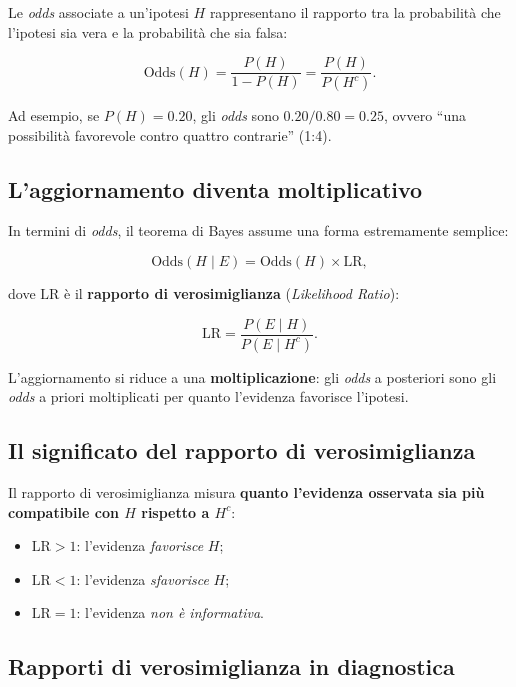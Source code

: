 \documentclass[
  italian,
  letterpaper,
  a4paper,
  11pt,
  open=any]{scrbook}
\providecommand{\tightlist}{%
  \setlength{\itemsep}{0pt}\setlength{\parskip}{0pt}}
\theoremstyle{plain}
\theoremstyle{definition}
\theoremstyle{definition}
\theoremstyle{remark}
\begin{document}
Le \emph{odds} associate a un'ipotesi \(H\) rappresentano il rapporto
tra la probabilità che l'ipotesi sia vera e la probabilità che sia
falsa:

\[
\text{Odds}(H) = \frac{P(H)}{1 - P(H)} = \frac{P(H)}{P(H^c)}.
\]

Ad esempio, se \(P(H) = 0.20\), gli \emph{odds} sono
\(0.20/0.80 = 0.25\), ovvero ``una possibilità favorevole contro quattro
contrarie'' (1:4).

\subsection{L'aggiornamento diventa
moltiplicativo}\label{laggiornamento-diventa-moltiplicativo}

In termini di \emph{odds}, il teorema di Bayes assume una forma
estremamente semplice:

\[
\text{Odds}(H \mid E) = \text{Odds}(H) \times \text{LR},
\]

dove \(\text{LR}\) è il \textbf{rapporto di verosimiglianza}
(\emph{Likelihood Ratio}):

\[
\text{LR} = \frac{P(E \mid H)}{P(E \mid H^c)}.
\]

L'aggiornamento si riduce a una \textbf{moltiplicazione}: gli
\emph{odds} a posteriori sono gli \emph{odds} a priori moltiplicati per
quanto l'evidenza favorisce l'ipotesi.

\subsection{Il significato del rapporto di
verosimiglianza}\label{il-significato-del-rapporto-di-verosimiglianza}

Il rapporto di verosimiglianza misura \textbf{quanto l'evidenza
osservata sia più compatibile con \(H\) rispetto a \(H^c\)}:

\begin{itemize}
\tightlist
\item
  \(\text{LR} > 1\): l'evidenza \emph{favorisce} \(H\);
\item
  \(\text{LR} < 1\): l'evidenza \emph{sfavorisce} \(H\);
\item
  \(\text{LR} = 1\): l'evidenza \emph{non è informativa}.
\end{itemize}

\subsection{Rapporti di verosimiglianza in
diagnostica}\label{rapporti-di-verosimiglianza-in-diagnostica}
\end{document}
